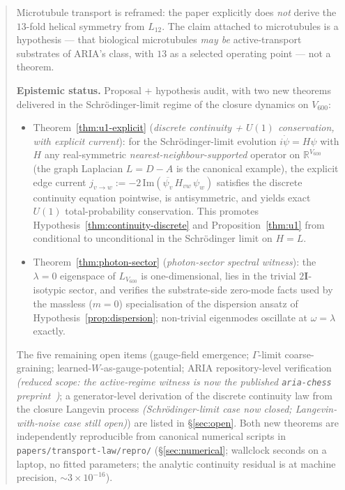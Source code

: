 \documentclass[11pt]{article}
\theoremstyle{definition}
\newcommand{\R}{\mathbb{R}}
\newcommand{\twoI}{2\mathbf{I}}
\begin{document}
\begin{abstract}
Microtubule transport is reframed: the paper explicitly does \emph{not} derive the $13$-fold helical symmetry from $L_{12}$. The claim attached to microtubules is a hypothesis --- that biological microtubules \emph{may be} active-transport substrates of ARIA's class, with $13$ as a selected operating point --- not a theorem.

\vspace{4pt}
\noindent\textbf{Epistemic status.} Proposal + hypothesis audit, with two new theorems delivered in the Schr\"{o}dinger-limit regime of the closure dynamics on $V_{600}$:
\begin{itemize}\itemsep=2pt
\item Theorem~\ref{thm:u1-explicit} (\emph{discrete continuity + $U(1)$ conservation, with explicit current}): for the Schr\"{o}dinger-limit evolution $i\dot\psi = H\psi$ with $H$ any real-symmetric \emph{nearest-neighbour-supported} operator on $\R^{V_{600}}$ (the graph Laplacian $L = D - A$ is the canonical example), the explicit edge current $j_{v\to w} := -2\,\mathrm{Im}(\overline{\psi_v}\,H_{vw}\,\psi_w)$ satisfies the discrete continuity equation pointwise, is antisymmetric, and yields exact $U(1)$ total-probability conservation. This promotes Hypothesis~\ref{thm:continuity-discrete} and Proposition~\ref{thm:u1} from conditional to unconditional in the Schr\"{o}dinger limit on $H = L$.
\item Theorem~\ref{thm:photon-sector} (\emph{photon-sector spectral witness}): the $\lambda = 0$ eigenspace of $L_{V_{600}}$ is one-dimensional, lies in the trivial $\twoI$-isotypic sector, and verifies the substrate-side zero-mode facts used by the massless ($m = 0$) specialisation of the dispersion ansatz of Hypothesis~\ref{prop:dispersion}; non-trivial eigenmodes oscillate at $\omega = \lambda$ exactly.
\end{itemize}
The five remaining open items (gauge-field emergence; $\Gamma$-limit coarse-graining; learned-$W$-as-gauge-potential; ARIA repository-level verification \emph{(reduced scope: the active-regime witness is now the published \texttt{aria-chess} preprint~\citep{SmartARIAChess2026})}; a generator-level derivation of the discrete continuity law from the closure Langevin process \emph{(Schr\"{o}dinger-limit case now closed; Langevin-with-noise case still open)}) are listed in \S\ref{sec:open}. Both new theorems are independently reproducible from canonical numerical scripts in \texttt{papers/transport-law/repro/} (\S\ref{sec:numerical}; wallclock seconds on a laptop, no fitted parameters; the analytic continuity residual is at machine precision, $\sim 3 \times 10^{-16}$).
\end{abstract}
\end{document}
